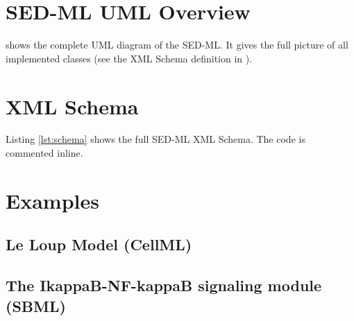 \documentclass[pdftex,rgb,dvipsnames,svgnames,hyperref,table]{article}
\begin{document}
\begin{appendix}
\newpage
\section{SED-ML UML Overview}
 shows the complete UML diagram of the SED-ML. It gives the full picture of all implemented classes (see the XML Schema definition in \pageref{lst:schema}).
\label{app:uml}
%
  

\section{XML Schema}
Listing \ref{lst:schema} shows the full SED-ML XML Schema. The code is commented inline.
\label{sec:xmlschema}


\newpage
\section{Examples}

\subsection{Le Loup Model (CellML)}


\newpage
\subsection{The IkappaB-NF-kappaB signaling module (SBML)}


\end{appendix}



\end{document}
